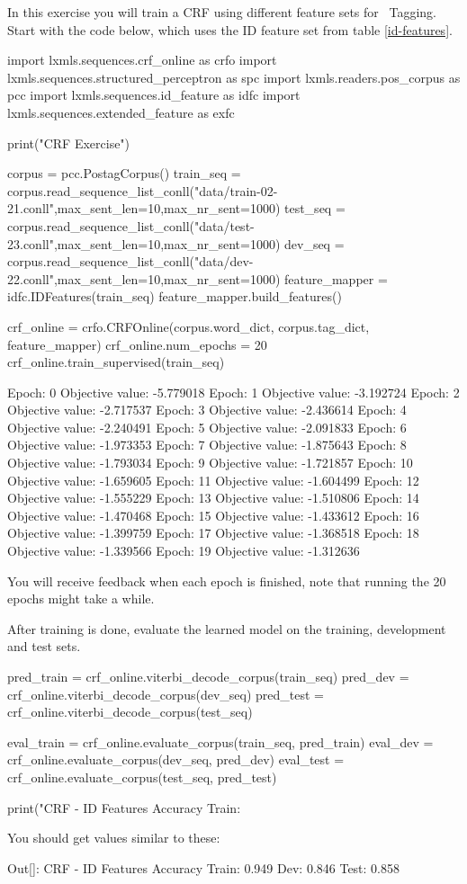 \begin{exercise}\label{exer:crf1}
In this exercise you will train a CRF
using different feature sets for \pos\ Tagging. Start with the code below, which uses the ID feature set from table \ref{id-features}.
\begin{python}
import lxmls.sequences.crf_online as crfo
import lxmls.sequences.structured_perceptron as spc
import lxmls.readers.pos_corpus as pcc
import lxmls.sequences.id_feature as idfc
import lxmls.sequences.extended_feature as exfc

print("CRF Exercise")

corpus = pcc.PostagCorpus()
train_seq = corpus.read_sequence_list_conll("data/train-02-21.conll",max_sent_len=10,max_nr_sent=1000)
test_seq = corpus.read_sequence_list_conll("data/test-23.conll",max_sent_len=10,max_nr_sent=1000)
dev_seq = corpus.read_sequence_list_conll("data/dev-22.conll",max_sent_len=10,max_nr_sent=1000)
feature_mapper = idfc.IDFeatures(train_seq)
feature_mapper.build_features()

crf_online = crfo.CRFOnline(corpus.word_dict, corpus.tag_dict, feature_mapper)
crf_online.num_epochs = 20
crf_online.train_supervised(train_seq)

Epoch: 0 Objective value: -5.779018
Epoch: 1 Objective value: -3.192724
Epoch: 2 Objective value: -2.717537
Epoch: 3 Objective value: -2.436614
Epoch: 4 Objective value: -2.240491
Epoch: 5 Objective value: -2.091833
Epoch: 6 Objective value: -1.973353
Epoch: 7 Objective value: -1.875643
Epoch: 8 Objective value: -1.793034
Epoch: 9 Objective value: -1.721857
Epoch: 10 Objective value: -1.659605
Epoch: 11 Objective value: -1.604499
Epoch: 12 Objective value: -1.555229
Epoch: 13 Objective value: -1.510806
Epoch: 14 Objective value: -1.470468
Epoch: 15 Objective value: -1.433612
Epoch: 16 Objective value: -1.399759
Epoch: 17 Objective value: -1.368518
Epoch: 18 Objective value: -1.339566
Epoch: 19 Objective value: -1.312636
\end{python}

You will receive feedback when each epoch is finished, note that
running the 20 epochs might take a while.

After training is done, evaluate the learned model on the training, development and test sets.

\begin{python}
pred_train = crf_online.viterbi_decode_corpus(train_seq)
pred_dev = crf_online.viterbi_decode_corpus(dev_seq)
pred_test = crf_online.viterbi_decode_corpus(test_seq)

eval_train = crf_online.evaluate_corpus(train_seq, pred_train)
eval_dev = crf_online.evaluate_corpus(dev_seq, pred_dev)
eval_test = crf_online.evaluate_corpus(test_seq, pred_test)

print("CRF - ID Features Accuracy Train: %
\end{python}

You should get values similar to these:
\begin{python}
Out[]: CRF - 
ID Features Accuracy Train: 0.949 Dev: 0.846 Test: 0.858
\end{python}
\end{exercise}

